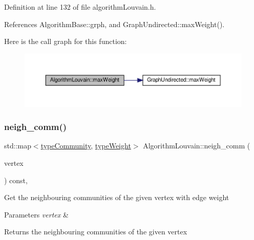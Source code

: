 Definition at line 132 of file algorithm\+Louvain.\+h.



References Algorithm\+Base\+::grph, and Graph\+Undirected\+::max\+Weight().

Here is the call graph for this function\+:
\nopagebreak
\begin{figure}[H]
\begin{center}
\leavevmode
\includegraphics[width=350pt]{classAlgorithmLouvain_a0b2ef33d5d1bf8b9aa2f8c73921844ac_cgraph}
\end{center}
\end{figure}
\mbox{\label{classAlgorithmLouvain_a78dfa81bd96f4036e44c17318501b6b7}} 
\subsubsection{\texorpdfstring{neigh\+\_\+comm()}{neigh\_comm()}}
{\footnotesize\ttfamily std\+::map$<$\hyperlink{graphUndirectedGroupable_8h_a914da95c9ea7f14f4b7f875c36818556}{type\+Community}, \hyperlink{edge_8h_a2e7ea3be891ac8b52f749ec73fee6dd2}{type\+Weight}$>$ Algorithm\+Louvain\+::neigh\+\_\+comm (\begin{DoxyParamCaption}\item[{const \hyperlink{edge_8h_a5fbd20c46956d479cb10afc9855223f6}{type\+Vertex} \&}]{vertex }\end{DoxyParamCaption}) const\hspace{0.3cm}{\ttfamily [inline]}, {\ttfamily [private]}}

Get the neighbouring communities of the given vertex with edge weight


\begin{DoxyParams}{Parameters}
{\em vertex} & \\
\hline
\end{DoxyParams}
\begin{DoxyReturn}{Returns}
the neighbouring communities of the given vertex 
\end{DoxyReturn}


